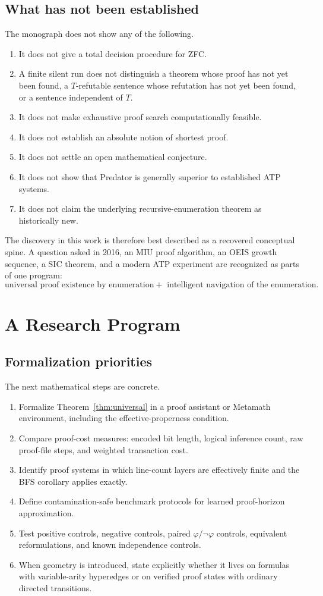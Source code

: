 \documentclass[11pt,oneside]{book}
\theoremstyle{definition}
\theoremstyle{remark}
\begin{document}
\section{What has not been established}
The monograph does not show any of the following.
\begin{enumerate}
\item It does not give a total decision procedure for ZFC.
\item A finite silent run does not distinguish a theorem whose proof has not yet been found, a $T$-refutable sentence whose refutation has not yet been found, or a sentence independent of $T$.
\item It does not make exhaustive proof search computationally feasible.
\item It does not establish an absolute notion of shortest proof.
\item It does not settle an open mathematical conjecture.
\item It does not show that Predator is generally superior to established ATP systems.
\item It does not claim the underlying recursive-enumeration theorem as historically new.
\end{enumerate}
The discovery in this work is therefore best described as a recovered conceptual spine. A question asked in 2016, an MIU proof algorithm, an OEIS growth sequence, a SIC theorem, and a modern ATP experiment are recognized as parts of one program:
\[
\text{universal proof existence by enumeration}
+\text{ intelligent navigation of the enumeration}.
\]

\chapter{A Research Program}
\section{Formalization priorities}
The next mathematical steps are concrete.
\begin{enumerate}
\item Formalize Theorem~\ref{thm:universal} in a proof assistant or Metamath environment, including the effective-properness condition.
\item Compare proof-cost measures: encoded bit length, logical inference count, raw proof-file steps, and weighted transaction cost.
\item Identify proof systems in which line-count layers are effectively finite and the BFS corollary applies exactly.
\item Define contamination-safe benchmark protocols for learned proof-horizon approximation.
\item Test positive controls, negative controls, paired $\varphi/\neg\varphi$ controls, equivalent reformulations, and known independence controls.
\item When geometry is introduced, state explicitly whether it lives on formulas with variable-arity hyperedges or on verified proof states with ordinary directed transitions.
\end{enumerate}
\end{document}
